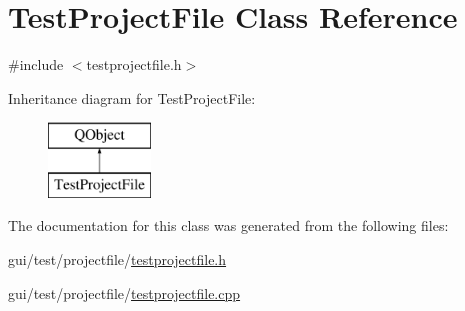 \hypertarget{class_test_project_file}{\section{Test\-Project\-File Class Reference}
\label{class_test_project_file}
}


{\ttfamily \#include $<$testprojectfile.\-h$>$}

Inheritance diagram for Test\-Project\-File\-:\begin{figure}[H]
\begin{center}
\leavevmode
\includegraphics[height=2.000000cm]{class_test_project_file}
\end{center}
\end{figure}


The documentation for this class was generated from the following files\-:\begin{DoxyCompactItemize}
\item 
gui/test/projectfile/\hyperlink{testprojectfile_8h}{testprojectfile.\-h}\item 
gui/test/projectfile/\hyperlink{testprojectfile_8cpp}{testprojectfile.\-cpp}\end{DoxyCompactItemize}
